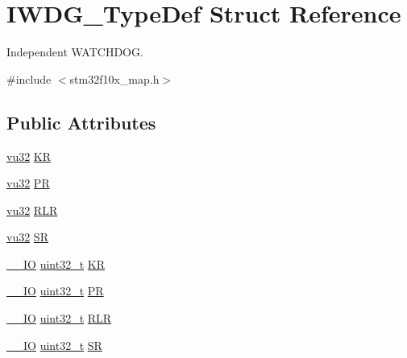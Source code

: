 \hypertarget{struct_i_w_d_g___type_def}{}\section{I\+W\+D\+G\+\_\+\+Type\+Def Struct Reference}
\label{struct_i_w_d_g___type_def}


Independent W\+A\+T\+C\+H\+D\+OG.  




{\ttfamily \#include $<$stm32f10x\+\_\+map.\+h$>$}

\subsection*{Public Attributes}
\begin{DoxyCompactItemize}
\item 
\hyperlink{agilefox_2library_2inc_2stm32f10x__type_8h_a6e2761f0a1011f84ed96b946f2c8a563}{vu32} \hyperlink{struct_i_w_d_g___type_def_ac8920afdfd534474b3ad53d5c80e893c}{KR}
\item 
\hyperlink{agilefox_2library_2inc_2stm32f10x__type_8h_a6e2761f0a1011f84ed96b946f2c8a563}{vu32} \hyperlink{struct_i_w_d_g___type_def_ac9f41bee7457da9f9e4891104b741659}{PR}
\item 
\hyperlink{agilefox_2library_2inc_2stm32f10x__type_8h_a6e2761f0a1011f84ed96b946f2c8a563}{vu32} \hyperlink{struct_i_w_d_g___type_def_a3bd3ead202b69da2549f9eabff1eb68c}{R\+LR}
\item 
\hyperlink{agilefox_2library_2inc_2stm32f10x__type_8h_a6e2761f0a1011f84ed96b946f2c8a563}{vu32} \hyperlink{struct_i_w_d_g___type_def_a74a3162d8bab5645e11877a2ccb967fb}{SR}
\item 
\hyperlink{group___c_m_s_i_s___c_m3__core__definitions_gaec43007d9998a0a0e01faede4133d6be}{\+\_\+\+\_\+\+IO} \hyperlink{_p_e___types_8h_a33594304e786b158f3fb30289278f5af}{uint32\+\_\+t} \hyperlink{struct_i_w_d_g___type_def_a63089aaa5f4ad34ee2677ebcdee49cd9}{KR}
\item 
\hyperlink{group___c_m_s_i_s___c_m3__core__definitions_gaec43007d9998a0a0e01faede4133d6be}{\+\_\+\+\_\+\+IO} \hyperlink{_p_e___types_8h_a33594304e786b158f3fb30289278f5af}{uint32\+\_\+t} \hyperlink{struct_i_w_d_g___type_def_a5f2717885ff171e686e0347af9e6b68d}{PR}
\item 
\hyperlink{group___c_m_s_i_s___c_m3__core__definitions_gaec43007d9998a0a0e01faede4133d6be}{\+\_\+\+\_\+\+IO} \hyperlink{_p_e___types_8h_a33594304e786b158f3fb30289278f5af}{uint32\+\_\+t} \hyperlink{struct_i_w_d_g___type_def_aa3703eaa40e447dcacc69c0827595532}{R\+LR}
\item 
\hyperlink{group___c_m_s_i_s___c_m3__core__definitions_gaec43007d9998a0a0e01faede4133d6be}{\+\_\+\+\_\+\+IO} \hyperlink{_p_e___types_8h_a33594304e786b158f3fb30289278f5af}{uint32\+\_\+t} \hyperlink{struct_i_w_d_g___type_def_a9bbfbe921f2acfaf58251849bd0a511c}{SR}
\end{DoxyCompactItemize}



